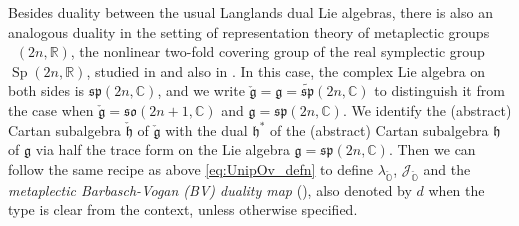 \documentclass[11pt, a4paper]{amsart}
\newcommand{\C}{\mathbb{C}}
\newcommand{\g}{\mathfrak{g}}
\newcommand{\orb}{\mathbb{O}}
\newcommand{\fg}{\mathfrak{g}}
\newcommand{\fh}{\mathfrak{h}}
\newcommand{\ckfg}{{\check{\fg}}}
\newcommand{\ckfh}{{\check{\fh}}}
\newcommand{\ckorb}{\check{\orb}}
\newcommand{\fso}{\mathfrak{so}}
\newcommand{\fsp}{\mathfrak{sp}}
\newcommand{\fmp}{\widetilde{\mathfrak{sp}}}
\newcommand{\cN}{\mathcal{N}}
\newcommand{\cJ}{\mathcal{J}}
\newcommand{\cV}{\mathcal{V}}
\newcommand{\cZ}{\mathcal{Z}}
\newcommand{\cU}{\mathcal{U}}
\newcommand{\Ug}{\cU\fg}
\newcommand{\Zg}{\cZ\fg}
\DeclareMathOperator{\Mp}{\widetilde{Sp}}
\newcommand{\Sp}{\operatorname{Sp}}
\newcommand{\R}{\mathbb{R}}
\newcommand{\slf}{\mathfrak{sl}}
\theoremstyle{definition}
\numberwithin{equation}{section}
\begin{document}

Besides duality between the usual Langlands dual Lie algebras, there is also an analogous duality in the setting of representation theory of metaplectic groups $\Mp(2n,\R)$, the nonlinear two-fold covering group of the real symplectic group $\Sp(2n,\R)$, studied in \cite{BMSZ:metaplecticBV} and also in \cite{JLS:Duality}. In this case, the complex Lie algebra on both sides is $\fsp(2n,\C)$, and we write $\ckfg = \fg = \fmp(2n,\C)$ to distinguish it from the case when $\ckfg = \fso(2n+1,\C)$ and $\fg = \fsp(2n,\C)$. 
We identify the (abstract) Cartan subalgebra $\ckfh$ of $\ckfg$ with the dual $\fh^*$ of the (abstract) Cartan subalgebra $\fh$ of $\fg$ via half the trace form on the Lie algebra $\fg = \fsp(2n,\C)$. Then we can follow the same recipe as above \eqref{eq:UnipOv_defn} to define $\lambda_{\ckorb}$, $\cJ_{\ckorb}$ and the {\it metaplectic Barbasch-Vogan (BV) duality map} (\cite{BMSZ:metaplecticBV}), also denoted by $d$ when the type is clear from the context, unless otherwise specified. 
\end{document}
